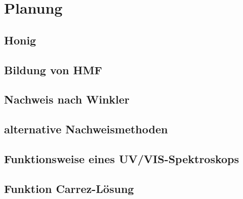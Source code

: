 \chapter{Planung}

\label{chap:Planung}

\section{Honig}

\section{Bildung von HMF}

\section{Nachweis nach Winkler}

\section{alternative Nachweismethoden}

\section{Funktionsweise eines UV/VIS-Spektroskops}

\section{Funktion Carrez-Lösung}

